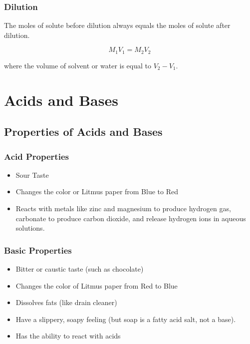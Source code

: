 \subsubsection{Dilution}

The moles of solute before dilution always equals the moles of solute after dilution.

\begin{equation}
M_{1} V_{1} = M_{2} V_{2}
\end{equation}

where the volume of solvent or water is equal to $V_{2} - V_{1}$.

\section{Acids and Bases}

\subsection{Properties of Acids and Bases}

\subsubsection{Acid Properties}

\begin{itemize}
\item Sour Taste
\item Changes the color or Litmus paper from Blue to Red
\item Reacts with metals like zinc and magnesium to produce hydrogen gas, carbonate to produce carbon dioxide, and release hydrogen ions in aqueous solutions.
\end{itemize}

\subsubsection{Basic Properties}

\begin{itemize}
\item Bitter or caustic taste (such as chocolate)
\item Changes the color of Litmus paper from Red to Blue
\item Dissolves fats (like drain cleaner)
\item Have a slippery, soapy feeling (but soap is a fatty acid salt, not a base).
\item Has the ability to react with acids
\end{itemize}

